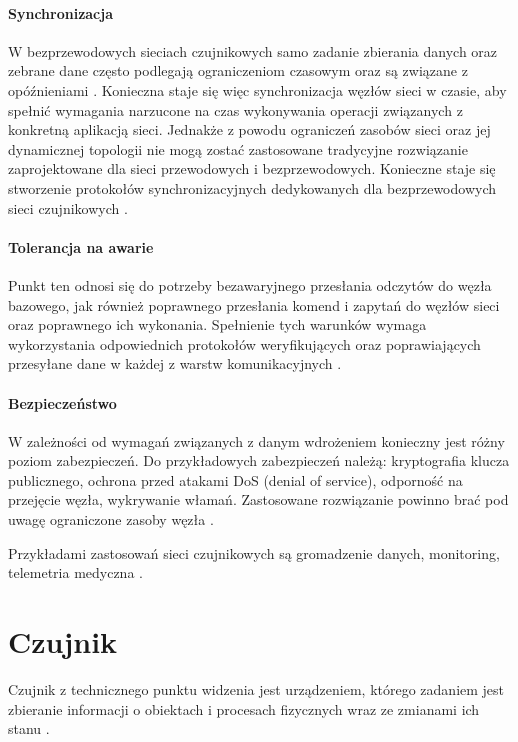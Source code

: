 \paragraph{Synchronizacja}
W bezprzewodowych sieciach czujnikowych samo zadanie zbierania danych oraz zebrane dane często podlegają ograniczeniom czasowym oraz są związane z opóźnieniami \cite{Alnuaimi2011}. Konieczna staje się więc synchronizacja węzłów sieci w czasie, aby spełnić wymagania narzucone na czas wykonywania operacji związanych z konkretną aplikacją sieci. Jednakże z powodu ograniczeń zasobów sieci oraz jej dynamicznej topologii nie mogą zostać zastosowane tradycyjne rozwiązanie zaprojektowane dla sieci przewodowych i bezprzewodowych. Konieczne staje się stworzenie protokołów synchronizacyjnych dedykowanych dla bezprzewodowych sieci czujnikowych \cite{Howitt2006}.

\paragraph{Tolerancja na awarie}
Punkt ten odnosi się do potrzeby bezawaryjnego przesłania odczytów do węzła bazowego, jak również poprawnego przesłania komend i zapytań do węzłów sieci oraz poprawnego ich wykonania. Spełnienie tych warunków wymaga wykorzystania odpowiednich protokołów weryfikujących oraz poprawiających przesyłane dane w każdej z warstw komunikacyjnych \cite{Kakamanshadi2015}.

\paragraph{Bezpieczeństwo}
W zależności od wymagań związanych z danym wdrożeniem konieczny jest różny poziom zabezpieczeń. Do przykładowych zabezpieczeń należą: kryptografia klucza publicznego, ochrona przed atakami DoS (denial of service), odporność na przejęcie węzła, wykrywanie włamań. Zastosowane rozwiązanie powinno brać pod uwagę ograniczone zasoby węzła \cite{Pathan2010}.

\bigskip

Przykładami zastosowań sieci czujnikowych są gromadzenie danych, monitoring, telemetria medyczna \cite{Biradar2009}.

\section{Czujnik}
Czujnik z technicznego punktu widzenia jest urządzeniem, którego zadaniem jest zbieranie informacji o obiektach i procesach fizycznych wraz ze zmianami ich stanu \cite{Dargie2010}.

